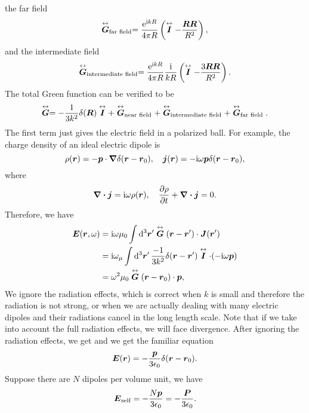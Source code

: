 \documentclass[hyperref, a4paper]{article}
\newcommand*{\ii}{\mathrm{i}}
\newcommand*{\ee}{\mathrm{e}}
\renewcommand{\tensor}[1]{ \stackrel{\leftrightarrow}{\vb*{#1}}}
\begin{document}
the far field
\begin{equation}
    \tensor{G}_\text{far field} = \frac{\ee^{\ii k R}}{4 \pi R} \left( \tensor{I} - \frac{\vb*{R} \vb*{R}}{R^2} \right),
\end{equation}
and the intermediate field 
\begin{equation}
    \tensor{G}_\text{intermediate field} = \frac{\ee^{\ii k R}}{4 \pi R} \frac{\ii}{k R} \left( \tensor{I} - \frac{3 \vb*{R} \vb*{R}}{R^2} \right).
\end{equation}
The total Green function can be verified to be 
\begin{equation}
    \tensor{\vb*{G}} = - \frac{1}{3 k^2} \delta(\vb*{R}) \tensor{\vb*{I}} + \tensor{G}_\text{near field} + \tensor{G}_\text{intermediate field} + \tensor{G}_\text{far field}.
\end{equation}
The first term just gives the electric field in a polarized ball.
For example, the charge density of an ideal electric dipole is 
\begin{equation}
    \rho(\vb*{r}) = - \vb*{p} \cdot \grad \delta(\vb*{r} - \vb*{r}_0), \quad \vb*{j}(\vb*{r}) = - \ii \omega \vb*{p} \delta(\vb*{r} - \vb*{r}_0), 
\end{equation}
where 
\[
    \div{\vb*{j}} = \ii \omega \rho(\vb*{r}), \quad \pdv{\rho}{t} + \div{\vb*{j}} = 0.
\]
Therefore, we have 
\begin{equation}
    \begin{aligned}
        \vb*{E}(\vb*{r}, \omega) &= \ii \omega \mu_0 \int \dd[3]{\vb*{r}'} \tensor{G}(\vb*{r} - \vb*{r}') \cdot \vb*{J}(\vb*{r}') \\
        &= \ii \omega_\mu \int \dd[3]{\vb*{r}'} \frac{-1}{3k^2} \delta(\vb*{r} - \vb*{r}') \tensor{\vb*{I}} \cdot (- \ii \omega \vb*{p}) \\
        &= \omega^2 \mu_0 \tensor{G}(\vb*{r} - \vb*{r}_0) \cdot \vb*{p},
    \end{aligned}
\end{equation}
We ignore the radiation effects, which is correct when $k$ is small and therefore the radiation is not strong,
or when we are actually dealing with many electric dipoles and their radiations cancel in the long length scale.
Note that if we take into account the full radiation effects, we will face divergence. After ignoring the radiation
effects, we get 
and we get the familiar equation
\begin{equation}
    \vb*{E}(\vb*{r}) = - \frac{\vb*{p}}{3 \epsilon_0} \delta(\vb*{r} - \vb*{r}_0).
\end{equation}
Suppose there are $N$ dipoles per volume unit, we have 
\begin{equation}
    \vb*{E}_\text{self} = - \frac{N \vb*{p}}{3 \epsilon_0} = - \frac{\vb*{P}}{3 \epsilon_0}.
    \label{eq:self-field-dipole}
\end{equation}
\end{document}
